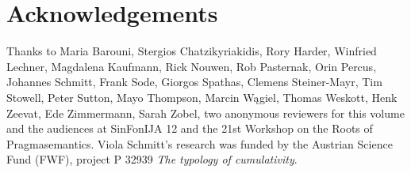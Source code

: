 \documentclass[output=paper]{langscibook}
\begin{document}
\section*{Acknowledgements}

Thanks to Maria Barouni, Stergios Chatzikyriakidis, Rory Harder, Winfried Lechner, Magdalena Kaufmann, Rick Nouwen, Rob Pasternak, Orin Percus, Johannes Schmitt, Frank Sode, Giorgos Spathas, Clemens Steiner-Mayr, Tim Stowell, Peter Sutton, Mayo Thompson, Marcin Wągiel, Thomas Weskott, Henk Zeevat, Ede Zimmermann, Sarah Zobel, two anonymous reviewers for this volume and the audiences at SinFonIJA 12 and the 21st Workshop on the Roots of Pragmasemantics. Viola Schmitt's research was funded by the Austrian Science Fund (FWF), project P 32939 \textit{The typology of cumulativity}. 

{\sloppy\printbibliography[heading=subbibliography,notkeyword=this]}
\end{document}
